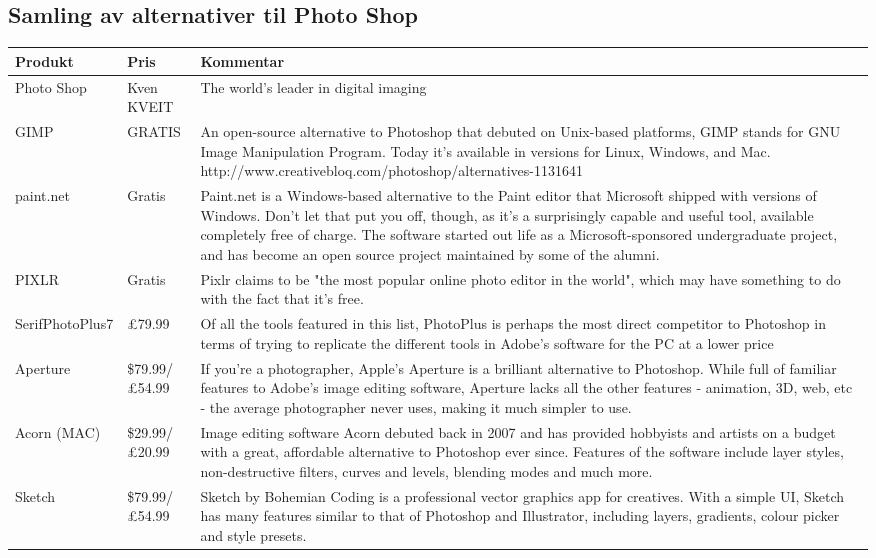\subsection{Samling av alternativer til Photo Shop}
\begin{center}
\begin{tabular}{ | m{4cm} | m{2cm}| m{8cm} | } 
\hline
\textbf{Produkt} & \textbf{Pris} & \textbf{Kommentar} \\
\hline
Photo Shop & Kven KVEIT & The world's leader in digital imaging\\
\hline
{\color {green} GIMP } & GRATIS & An open-source alternative to Photoshop that debuted on Unix-based platforms, GIMP stands for GNU Image Manipulation Program. Today it's available in versions for Linux, Windows, and Mac. http://www.creativebloq.com/photoshop/alternatives-1131641\\
\hline
{\color {green} paint.net} & Gratis & Paint.net is a Windows-based alternative to the Paint editor that Microsoft shipped with versions of Windows. Don't let that put you off, though, as it's a surprisingly capable and useful tool, available completely free of charge. The software started out life as a Microsoft-sponsored undergraduate project, and has become an open source project maintained by some of the alumni.\\
\hline
{\color {green} PIXLR }& Gratis & Pixlr claims to be "the most popular online photo editor in the world", which may have something to do with the fact that it's free.\\
\hline
{\color{red} SerifPhotoPlus7 } & £79.99 & Of all the tools featured in this list, PhotoPlus is perhaps the most direct competitor to Photoshop in terms of trying to replicate the different tools in Adobe's software for the PC at a lower price \\
\hline
{\color{red} Aperture } & \$79.99/£54.99 & If you're a photographer, Apple's Aperture is a brilliant alternative to Photoshop. While full of familiar features to Adobe's image editing software, Aperture lacks all the other features - animation, 3D, web, etc - the average photographer never uses, making it much simpler to use.\\
\hline
{\color{red} Acorn (MAC)} & \$29.99/£20.99 & Image editing software Acorn debuted back in 2007 and has provided hobbyists and artists on a budget with a great, affordable alternative to Photoshop ever since. Features of the software include layer styles, non-destructive filters, curves and levels, blending modes and much more.\\
\hline
{\color{red} Sketch } & \$79.99/£54.99 & Sketch by Bohemian Coding is a professional vector graphics app for creatives. With a simple UI, Sketch has many features similar to that of Photoshop and Illustrator, including layers, gradients, colour picker and style presets.\\
\hline
\end{tabular}
\end{center}

